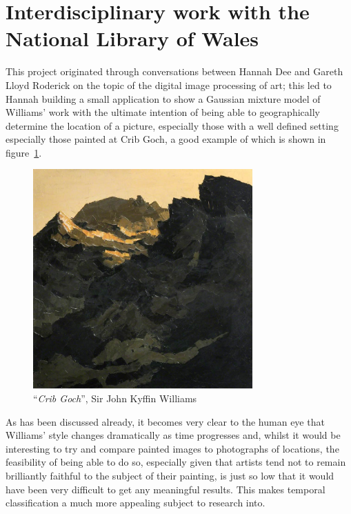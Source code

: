 \section{Interdisciplinary work with the National Library of Wales}

This project originated through conversations between Hannah Dee and Gareth Lloyd Roderick on the
topic of the digital image processing of art; this led to Hannah building a small application to
show a Gaussian mixture model of Williams' work with the ultimate intention of being able to geographically
determine the location of a picture, especially those with a well defined setting especially those
painted at Crib Goch, a good example of which is shown in figure~\ref{fig:crib-goch}.

\begin{figure}[h]
\centering
\includegraphics[width=0.75\textwidth]{img/crib_goch.jpg}
\caption[``\emph{Crib Goch}'']{``\emph{Crib Goch}'', Sir John Kyffin Williams}\label{fig:crib-goch}
\end{figure}

As has been discussed already, it becomes very clear to the human eye that Williams' style changes
dramatically as time progresses and, whilst it would be interesting to try and compare painted 
images to photographs of locations, the feasibility of being able to do so, especially given that
artists tend not to remain brilliantly faithful to the subject of their painting, is just so low
that it would have been very difficult to get any meaningful results. This makes temporal 
classification a much more appealing subject to research into.


